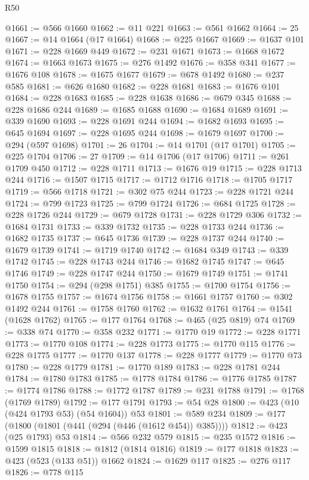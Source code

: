\begin{lexlean}{R50}
\begin{coremodule}
@1661 := @566 @1660
@1662 := @11 @221
@1663 := @561 @1662
@1664 := 25
@1667 := @14 @1664 (@17 @1664)
@1668 := @225 @1667
@1669 := @1637 @101
@1671 := @228 @1669 @449
@1672 := @231 @1671
@1673 := @1668 @1672
@1674 := @1663 @1673
@1675 := @276 @1492
@1676 := @358 @341
@1677 := @1676 @108
@1678 := @1675 @1677
@1679 := @678 @1492
@1680 := @237 @585
@1681 := @626 @1680
@1682 := @228 @1681
@1683 := @1676 @101
@1684 := @228 @1683
@1685 := @228 @1638
@1686 := @679 @345
@1688 := @228 @1686 @244
@1689 := @1685 @1688
@1690 := @1684 @1689
@1691 := @339 @1690
@1693 := @228 @1691 @244
@1694 := @1682 @1693
@1695 := @645 @1694
@1697 := @228 @1695 @244
@1698 := @1679 @1697
@1700 := @294 (@597 @1698)
@1701 := 26
@1704 := @14 @1701 (@17 @1701)
@1705 := @225 @1704
@1706 := 27
@1709 := @14 @1706 (@17 @1706)
@1711 := @261 @1709 @450
@1712 := @228 @1711
@1713 := @1676 @19
@1715 := @228 @1713 @244
@1716 := @1507 @1715
@1717 := @1712 @1716
@1718 := @1705 @1717
@1719 := @566 @1718
@1721 := @302 @75 @244
@1723 := @228 @1721 @244
@1724 := @799 @1723
@1725 := @799 @1724
@1726 := @684 @1725
@1728 := @228 @1726 @244
@1729 := @679 @1728
@1731 := @228 @1729 @306
@1732 := @1684 @1731
@1733 := @339 @1732
@1735 := @228 @1733 @244
@1736 := @1682 @1735
@1737 := @645 @1736
@1739 := @228 @1737 @244
@1740 := @1679 @1739
@1741 := @1719 @1740
@1742 := @1684 @349
@1743 := @339 @1742
@1745 := @228 @1743 @244
@1746 := @1682 @1745
@1747 := @645 @1746
@1749 := @228 @1747 @244
@1750 := @1679 @1749
@1751 := @1741 @1750
@1754 := @294 (@298 @1751) @385
@1755 := @1700 @1754
@1756 := @1678 @1755
@1757 := @1674 @1756
@1758 := @1661 @1757
@1760 := @302 @1492 @244
@1761 := @1758 @1760
@1762 := @1632 @1761
@1764 := @1541 (@1628 @1762)
@1765 := @177 @1764
@1768 := @465 (@25 @819) @74
@1769 := @338 @74
@1770 := @358 @232
@1771 := @1770 @19
@1772 := @228 @1771
@1773 := @1770 @108
@1774 := @228 @1773
@1775 := @1770 @115
@1776 := @228 @1775
@1777 := @1770 @137
@1778 := @228 @1777
@1779 := @1770 @73
@1780 := @228 @1779
@1781 := @1770 @189
@1783 := @228 @1781 @244
@1784 := @1780 @1783
@1785 := @1778 @1784
@1786 := @1776 @1785
@1787 := @1774 @1786
@1788 := @1772 @1787
@1789 := @231 @1788
@1791 := @1768 (@1769 @1789)
@1792 := @177 @1791
@1793 := @54 @28
@1800 := @423 (@10 (@424 @1793 @53) (@54 @1604)) @53
@1801 := @589 @234
@1809 := @177 (@1800 (@1801 (@441 (@294 (@446 (@1612 @454)) @385))))
@1812 := @423 (@25 @1793) @53
@1814 := @566 @232 @579
@1815 := @235 @1572
@1816 := @1599 @1815
@1818 := @1812 (@1814 @1816)
@1819 := @177 @1818
@1823 := @423 (@523 (@133 @51)) @1662
@1824 := @1629 @117
@1825 := @276 @117
@1826 := @778 @115

\end{coremodule}
\end{lexlean}
